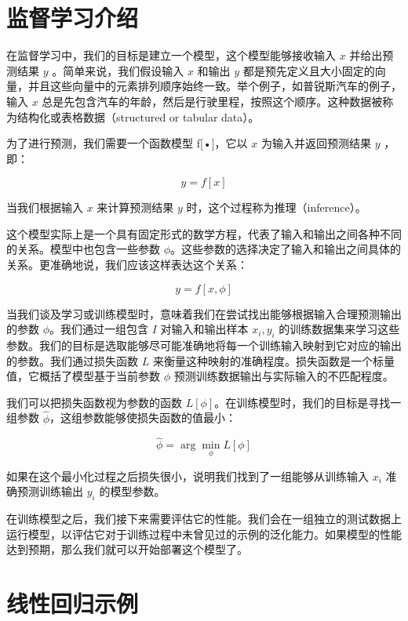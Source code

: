 \documentclass[lang=cn,newtx,10pt,scheme=chinese]{elegantbook}
\begin{document}
\section{监督学习介绍}

在监督学习中，我们的目标是建立一个模型，这个模型能够接收输入 $x$ 并给出预测结果 $y$ 。简单来说，我们假设输入 $x$ 和输出 $y$ 都是预先定义且大小固定的向量，并且这些向量中的元素排列顺序始终一致。举个例子，如普锐斯汽车的例子，输入 $x$ 总是先包含汽车的年龄，然后是行驶里程，按照这个顺序。这种数据被称为结构化或表格数据（structured or tabular data）。

为了进行预测，我们需要一个函数模型 f[•]，它以 $x$ 为输入并返回预测结果 $y$ ，即：

\begin{equation}
y = f[x] 
\end{equation}

当我们根据输入 $x$ 来计算预测结果 $y$ 时，这个过程称为推理（inference）。

这个模型实际上是一个具有固定形式的数学方程，代表了输入和输出之间各种不同的关系。模型中也包含一些参数 $\phi$。这些参数的选择决定了输入和输出之间具体的关系。更准确地说，我们应该这样表达这个关系：

\begin{equation}
y = f[x, \phi] 
\end{equation}

当我们谈及学习或训练模型时，意味着我们在尝试找出能够根据输入合理预测输出的参数 $\phi$。我们通过一组包含 $I$ 对输入和输出样本 ${x_i, y_i}$ 的训练数据集来学习这些参数。我们的目标是选取能够尽可能准确地将每一个训练输入映射到它对应的输出的参数。我们通过损失函数 $L$ 来衡量这种映射的准确程度。损失函数是一个标量值，它概括了模型基于当前参数 $\phi$ 预测训练数据输出与实际输入的不匹配程度。

我们可以把损失函数视为参数的函数 $L[\phi]$。在训练模型时，我们的目标是寻找一组参数 $\hat \phi$，这组参数能够使损失函数的值最小：

\begin{equation}
\hat \phi = \arg \mathop{\min}\limits_{\phi} L [\phi] 
\end{equation}

如果在这个最小化过程之后损失很小，说明我们找到了一组能够从训练输入 $x_i$ 准确预测训练输出 $y_i$ 的模型参数。

在训练模型之后，我们接下来需要评估它的性能。我们会在一组独立的测试数据上运行模型，以评估它对于训练过程中未曾见过的示例的泛化能力。如果模型的性能达到预期，那么我们就可以开始部署这个模型了。

\section{线性回归示例}
\end{document}
